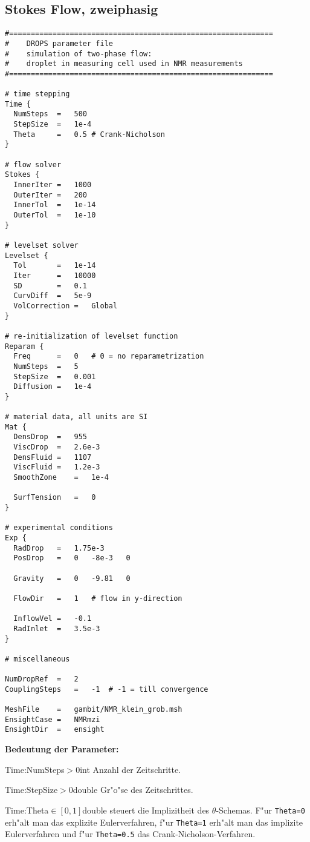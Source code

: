 \subsection{Stokes Flow, zweiphasig}
\begin{Code}
\begin{verbatim}
#=============================================================
#    DROPS parameter file
#    simulation of two-phase flow: 
#    droplet in measuring cell used in NMR measurements
#=============================================================

# time stepping
Time {
  NumSteps	=	500
  StepSize	=	1e-4
  Theta		=	0.5	# Crank-Nicholson
}

# flow solver
Stokes {
  InnerIter	=	1000
  OuterIter	=	200
  InnerTol	=	1e-14
  OuterTol	=	1e-10
}

# levelset solver
Levelset {
  Tol		=	1e-14
  Iter		=	10000
  SD		=	0.1
  CurvDiff	=	5e-9
  VolCorrection	=	Global
}

# re-initialization of levelset function
Reparam { 
  Freq		=	0	# 0 = no reparametrization
  NumSteps	=	5
  StepSize	=	0.001
  Diffusion	=	1e-4
}

# material data, all units are SI
Mat {
  DensDrop	=	955
  ViscDrop	=	2.6e-3
  DensFluid	=	1107
  ViscFluid	=	1.2e-3
  SmoothZone	=	1e-4
  
  SurfTension	=	0
}

# experimental conditions
Exp {
  RadDrop	=	1.75e-3
  PosDrop	=	0	-8e-3	0
  
  Gravity	=	0	-9.81	0
  
  FlowDir	=	1	# flow in y-direction
  
  InflowVel	=	-0.1
  RadInlet	=	3.5e-3
}  

# miscellaneous

NumDropRef	=	2
CouplingSteps	=	-1	# -1 = till convergence

MeshFile	=	gambit/NMR_klein_grob.msh
EnsightCase	=	NMRmzi
EnsightDir	=	ensight
\end{verbatim}
\end{Code}

{\bf Bedeutung der Parameter: }\\

\begin{Desc}
{Time:NumSteps}{$>0$}{int}
    Anzahl der Zeitschritte.
\end{Desc}
%
\begin{Desc}
{Time:StepSize}{$>0$}{double}
Gr"o"se des Zeitschrittes.
\end{Desc}
%
\begin{Desc}
{Time:Theta}{$\in[0,1]$}{double}
steuert die Implizitheit des $\theta$-Schemas. F"ur
\verb|Theta=0| erh"alt man das explizite Eulerverfahren, f"ur
\verb|Theta=1| erh"alt man das implizite Eulerverfahren und f"ur
\verb|Theta=0.5| das Crank-Nicholson-Verfahren.
\end{Desc}


